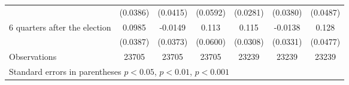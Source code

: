 \begin{table}[!ht]
\begin{tabular}{l*{6}{c}}
                    &    (0.0386)         &    (0.0415)         &    (0.0592)         &    (0.0281)         &    (0.0380)         &    (0.0487)         \\
[0.5em]
 6 quarters after the election&      0.0985\sym{*}  &     -0.0149         &       0.113         &       0.115\sym{***}&     -0.0138         &       0.128\sym{**} \\
                    &    (0.0387)         &    (0.0373)         &    (0.0600)         &    (0.0308)         &    (0.0331)         &    (0.0477)         \\
\hline
Observations        &       23705         &       23705         &       23705         &       23239         &       23239         &       23239         \\
\hline\hline
\multicolumn{7}{l}{ Standard errors in parentheses \sym{*} \(p<0.05\), \sym{**} \(p<0.01\), \sym{***} \(p<0.001\)}\\
\end{tabular}
\end{table}
